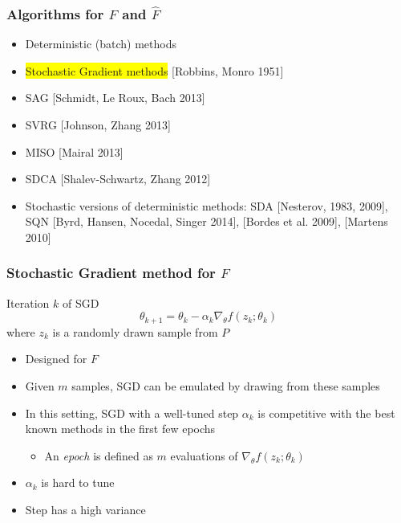 \documentclass{beamer}
\begin{document}
		\begin{frame}
			\frametitle{Algorithms for $F$ and $\hat{F}$}
			\begin{itemize}
				\item Deterministic (batch) methods
				\item \colorbox{yellow}{Stochastic Gradient methods} [Robbins, Monro 1951] 
				\item SAG [Schmidt, Le Roux, Bach 2013]
				\item SVRG [Johnson, Zhang 2013]
				\item MISO [Mairal 2013]
				\item SDCA [Shalev-Schwartz, Zhang 2012]
				\item Stochastic versions of deterministic methods: SDA [Nesterov, 1983, 2009], SQN [Byrd, Hansen, Nocedal, Singer 2014], [Bordes
et al. 2009], [Martens 2010]
			\end{itemize}
			\end{frame}
			
			
		\begin{frame}
			\frametitle{Stochastic Gradient method for $F$}

				\begin{block}{Iteration $k$ of SGD}
			\[
		\theta_{k+1}= \theta_k - \alpha_k \nabla_\theta f(z_k;\theta_k)
		\]
		where $z_k$ is a randomly drawn sample from $P$  \\
\end{block}

	
			\begin{itemize}
	\pause
				\item Designed for $F$ 
	
	\pause
				\item Given $m$ samples, SGD can be emulated by drawing from these samples
	
	\pause
				\item In this setting, SGD with a well-tuned step $\alpha_k$ is competitive with the best known methods in the first few epochs
	
	\begin{itemize}
	\pause
		\item An \textit{epoch} is defined as $m$ evaluations of $\nabla_\theta f(z_k;\theta_k)$
	\end{itemize}
	\pause
	
				\item $\alpha_k$ is hard to tune
				\pause
				\item Step has a high variance 
			\end{itemize}
		\end{frame}
\end{document}

